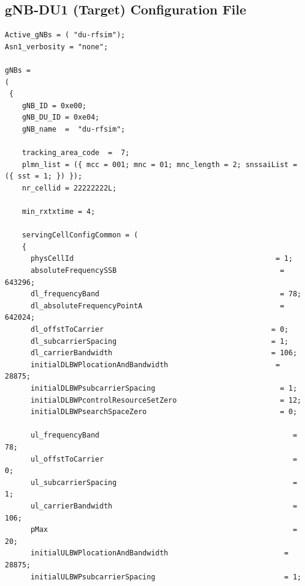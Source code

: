 \subsection{gNB-DU1 (Target) Configuration File}
\begin{lstlisting}[style=confstyle, caption=DU1 band78 PCI 1 Configuration]
Active_gNBs = ( "du-rfsim");
Asn1_verbosity = "none";

gNBs =
(
 {
    gNB_ID = 0xe00;
    gNB_DU_ID = 0xe04;
    gNB_name  =  "du-rfsim";

    tracking_area_code  =  7;
    plmn_list = ({ mcc = 001; mnc = 01; mnc_length = 2; snssaiList = ({ sst = 1; }) });
    nr_cellid = 22222222L;

    min_rxtxtime = 4;

    servingCellConfigCommon = (
    {
      physCellId                                               = 1;
      absoluteFrequencySSB                                      = 643296;
      dl_frequencyBand                                          = 78;
      dl_absoluteFrequencyPointA                                = 642024;
      dl_offstToCarrier                                       = 0;
      dl_subcarrierSpacing                                    = 1;
      dl_carrierBandwidth                                     = 106;
      initialDLBWPlocationAndBandwidth                         = 28875;
      initialDLBWPsubcarrierSpacing                             = 1;
      initialDLBWPcontrolResourceSetZero                        = 12;
      initialDLBWPsearchSpaceZero                               = 0;

      ul_frequencyBand                                             = 78;
      ul_offstToCarrier                                            = 0;
      ul_subcarrierSpacing                                         = 1;
      ul_carrierBandwidth                                          = 106;
      pMax                                                         = 20;
      initialULBWPlocationAndBandwidth                           = 28875;
      initialULBWPsubcarrierSpacing                              = 1;
      

\end{lstlisting}
